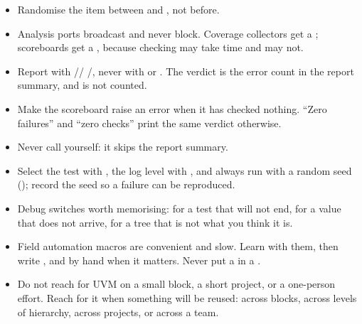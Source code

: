 \begin{itemize}
        . Missing  hangs after exactly
        one transaction.
  \item Randomise the item between  and ,
        not before.
  \item Analysis ports broadcast and never block. Coverage collectors get a
        ; scoreboards get a
        , because checking may take time and
         may not.
  \item Report with //%
        /, never with 
        or . The verdict is the error count in the report
        summary, and  is not counted.
  \item Make the scoreboard raise an error when it has checked nothing.
        ``Zero failures'' and ``zero checks'' print the same verdict otherwise.
  \item Never call  yourself: it skips the report summary.
  \item Select the test with , the log level with
        , and always run with a random seed
        (); record the seed so a failure can be
        reproduced.
  \item Debug switches worth memorising:  for a
        test that will not end,  for a value
        that does not arrive,  for a tree
        that is not what you think it is.
  \item Field automation macros are convenient and slow. Learn with them,
        then write ,  and
         by hand when it matters. Never put a 
        in a .
  \item Do not reach for UVM on a small block, a short project, or a
        one-person effort. Reach for it when something will be reused: across
        blocks, across levels of hierarchy, across projects, or across a
        team.
\end{itemize}
